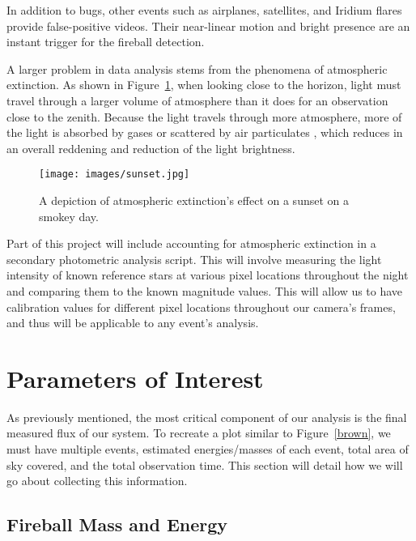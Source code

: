 In addition to bugs, other events such as airplanes, satellites, and Iridium flares provide false-positive videos.
Their near-linear motion and bright presence are an instant trigger for the fireball detection. 

A larger problem in data analysis stems from the phenomena of atmospheric extinction.
As shown in Figure~\ref{extinc}, when looking close to the horizon, light must travel through a larger volume of atmosphere than it does for an observation close to the zenith.  
Because the light travels through more atmosphere, more of the light is absorbed by gases or scattered by air particulates \cite{hughes_atmospheric_2016}, which reduces in an overall reddening and reduction of the light brightness.


\begin{figure}[ht!]
  \centering
  \texttt{[image: images/sunset.jpg]}
  \caption{A depiction of atmospheric extinction's effect on a sunset on a smokey day.}
  \label{extinc}
\end{figure}


Part of this project will include accounting for atmospheric extinction in a secondary photometric analysis script.
This will involve measuring the light intensity of known reference stars at various pixel locations throughout the night and comparing them to the known magnitude values.
This will allow us to have calibration values for different pixel locations throughout our camera's frames, and thus will be applicable to any event's analysis.


\section{Parameters of Interest}

As previously mentioned, the most critical component of our analysis is the final measured flux of our system. 
To recreate a plot similar to Figure~\ref{brown}, we must have multiple events, estimated energies/masses of each event, total area of sky covered, and the total observation time.
This section will detail how we will go about collecting this information.


\subsection{Fireball Mass and Energy}

